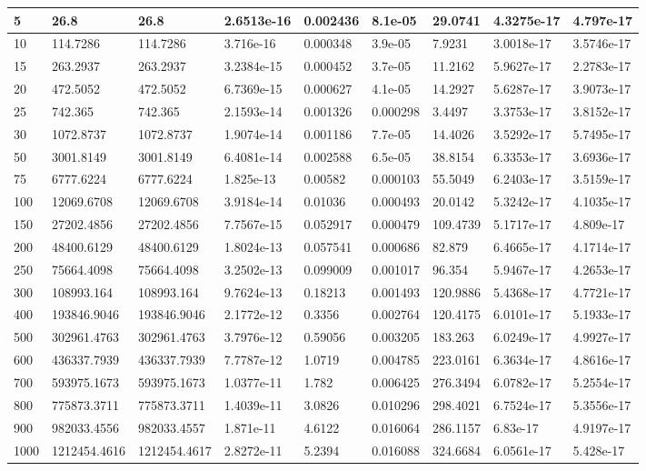 \begin{tabular}{|l|l|l|l|l|l|l|l|l|}
\hline
5&26.8&26.8&2.6513e-16&0.002436&8.1e-05&29.0741&4.3275e-17&4.797e-17\\\hline
10&114.7286&114.7286&3.716e-16&0.000348&3.9e-05&7.9231&3.0018e-17&3.5746e-17\\\hline
15&263.2937&263.2937&3.2384e-15&0.000452&3.7e-05&11.2162&5.9627e-17&2.2783e-17\\\hline
20&472.5052&472.5052&6.7369e-15&0.000627&4.1e-05&14.2927&5.6287e-17&3.9073e-17\\\hline
25&742.365&742.365&2.1593e-14&0.001326&0.000298&3.4497&3.3753e-17&3.8152e-17\\\hline
30&1072.8737&1072.8737&1.9074e-14&0.001186&7.7e-05&14.4026&3.5292e-17&5.7495e-17\\\hline
50&3001.8149&3001.8149&6.4081e-14&0.002588&6.5e-05&38.8154&6.3353e-17&3.6936e-17\\\hline
75&6777.6224&6777.6224&1.825e-13&0.00582&0.000103&55.5049&6.2403e-17&3.5159e-17\\\hline
100&12069.6708&12069.6708&3.9184e-14&0.01036&0.000493&20.0142&5.3242e-17&4.1035e-17\\\hline
150&27202.4856&27202.4856&7.7567e-15&0.052917&0.000479&109.4739&5.1717e-17&4.809e-17\\\hline
200&48400.6129&48400.6129&1.8024e-13&0.057541&0.000686&82.879&6.4665e-17&4.1714e-17\\\hline
250&75664.4098&75664.4098&3.2502e-13&0.099009&0.001017&96.354&5.9467e-17&4.2653e-17\\\hline
300&108993.164&108993.164&9.7624e-13&0.18213&0.001493&120.9886&5.4368e-17&4.7721e-17\\\hline
400&193846.9046&193846.9046&2.1772e-12&0.3356&0.002764&120.4175&6.0101e-17&5.1933e-17\\\hline
500&302961.4763&302961.4763&3.7976e-12&0.59056&0.003205&183.263&6.0249e-17&4.9927e-17\\\hline
600&436337.7939&436337.7939&7.7787e-12&1.0719&0.004785&223.0161&6.3634e-17&4.8616e-17\\\hline
700&593975.1673&593975.1673&1.0377e-11&1.782&0.006425&276.3494&6.0782e-17&5.2554e-17\\\hline
800&775873.3711&775873.3711&1.4039e-11&3.0826&0.010296&298.4021&6.7524e-17&5.3556e-17\\\hline
900&982033.4556&982033.4557&1.871e-11&4.6122&0.016064&286.1157&6.83e-17&4.9197e-17\\\hline
1000&1212454.4616&1212454.4617&2.8272e-11&5.2394&0.016088&324.6684&6.0561e-17&5.428e-17\\\hline
\end{tabular}
